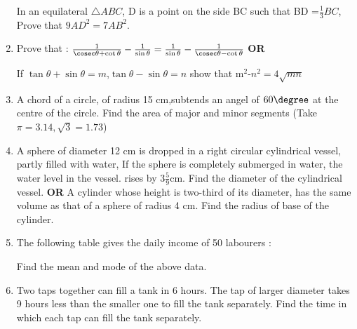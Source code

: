 \documentclass[journal,12pt,twocolumn]{IEEEtran}
\renewcommand\thesection{\arabic{section}}
\begin{document}
\begin{enumerate}[label=\thesection.\arabic*.,ref=\thesection.\theenumi]
In an equilateral $\triangle ABC$, D is a point on the side BC such that BD =$\frac{1}{3}BC$, Prove that $9AD^2 =7AB^2.$\\

\item Prove that : $\frac{1}{\cosec\theta + \cot\theta}-\frac{1}{\sin\theta}=\frac{1}{\sin\theta}-\frac{1}{\cosec\theta-\cot\theta}$
{\centering 
\newline \textbf{OR}}

If $\tan\theta + \sin\theta = m$,$\tan\theta-\sin\theta=n$ show that m$^2$-$n^2=4\sqrt{mn}$
\item A chord of a circle, of radius 15 cm,subtends an angel of $60\degree$ at the centre of the circle. Find the area of major and minor segments (Take $\pi=3.14, \sqrt{3}=1.73$)
\item A sphere of diameter 12 cm is dropped in a right circular cylindrical vessel, partly filled with water, If the sphere is completely submerged in water, the water level in the vessel. rises by $3\frac{5}{9}$cm. Find the diameter of the cylindrical vessel.
\newline \textbf{OR} \newline
A cylinder whose height is two-third of its diameter, has the same volume as that of a sphere of radius 4 cm. Find the radius of base of the cylinder.
\item The following table gives the daily income of 50 labourers :\\
\begin{table}[htb]
	\centering
Find the mean and mode of the above data.\\
\end{table}
\item Two taps together can fill a tank in 6 hours. The tap of larger diameter takes 9 hours  less than the smaller one to fill the tank separately. Find the time in which each tap can fill the tank separately.


\end{enumerate}
\end{document}
